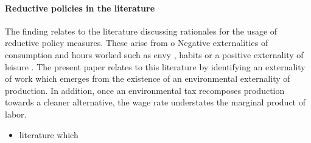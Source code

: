\paragraph{Reductive policies in the literature}
The finding relates to the literature discussing rationales for the usage of reductive policy measures. These arise from o
Negative externalities of consumption and hours worked such as
 envy \cite{Alvarez-Cuadrado2007EnvyHours}, habits \cite{Ravn2006DeepHabits}  or a positive externality of leisure \cite{Alesina2005WorkDifferent}. The present paper relates to this literature by identifying an externality of work which emerges from the existence of an environmental externality of production. In addition, once an environmental tax recomposes production towards a cleaner alternative, the wage rate understates the marginal product of labor. 
\begin{itemize}
	\item literature which \cite{Alvarez-Cuadrado2007EnvyHours}
\end{itemize}